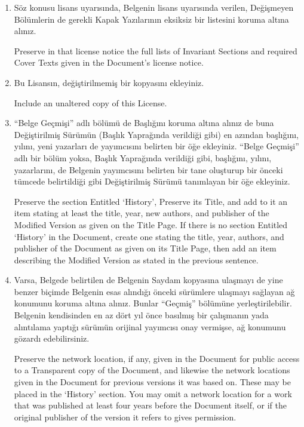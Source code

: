 \begin{multicols}{2}
\begin{enumerate}
\item Söz konusu lisans uyarısında, Belgenin lisans uyarısında verilen, Değişmeyen Bölümlerin de gerekli Kapak Yazılarının eksiksiz bir listesini koruma altına alınız. 
\begin{ingliz}Preserve in that license notice the full
lists of Invariant Sections and required Cover Texts given
in the Document's license notice.\end{ingliz}

\item Bu Lisansın, değiştirilmemiş bir kopyasını ekleyiniz.
\begin{ingliz}Include an unaltered copy of this License.\end{ingliz}          

\item “Belge Geçmişi” adlı bölümü de Başlığını koruma altına alınız de buna Değiştirilmiş Sürümün (Başlık Yaprağında verildiği gibi) en azından başlığını, yılını, yeni yazarları de yayımcısını belirten bir öğe ekleyiniz. “Belge Geçmişi” adlı bir bölüm yoksa, Başlık Yaprağında verildiği gibi, başlığını, yılını, yazarlarını, de Belgenin yayımcısını belirten bir tane oluşturup bir önceki tümcede belirtildiği gibi Değiştirilmiş Sürümü tanımlayan bir öğe ekleyiniz. 

\begin{ingliz}Preserve the section Entitled
`History', Preserve its Title, and add to it
an item stating at least the title, year, new authors, and
publisher of the Modified Version as given on the Title
Page.  If there is no section Entitled
`History' in the Document, create one stating
the title, year, authors, and publisher of the Document as
given on its Title Page, then add an item describing the
Modified Version as stated in the previous sentence.\end{ingliz}

\item Varsa, Belgede belirtilen de Belgenin Saydam kopyasına ulaşmayı de
yine benzer biçimde Belgenin esas alındığı önceki sürümlere ulaşmayı sağlayan ağ konumunu koruma altına alınız. Bunlar “Geçmiş” bölümüne yerleştirilebilir. Belgenin kendisinden en az dört yıl önce basılmış bir çalışmanın yada
alıntılama yaptığı sürümün orijinal yayımcısı onay vermişse, ağ konumunu gözardı edebilirsiniz.

\begin{ingliz}Preserve the network location, if any,
given in the Document for public access to a Transparent
copy of the Document, and likewise the network locations
given in the Document for previous versions it was based
on.  These may be placed in the `History'
section.  You may omit a network location for a work that
was published at least four years before the Document
itself, or if the original publisher of the version it
refers to gives permission.\end{ingliz}


\end{enumerate}
\end{multicols}
